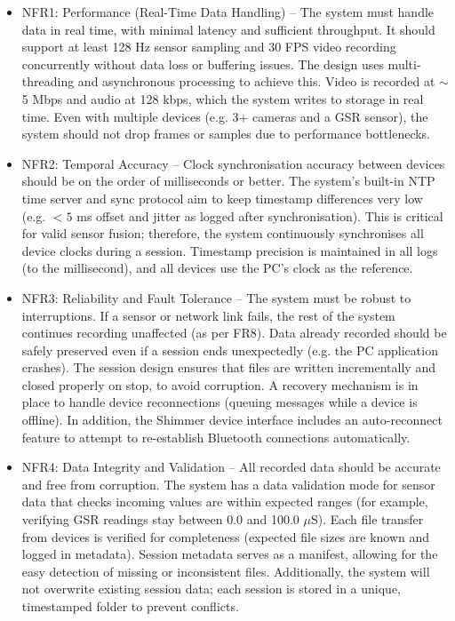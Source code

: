 \begin{itemize}
    \item NFR1: Performance (Real-Time Data Handling) -- The system must handle data in real time, with minimal latency and sufficient throughput. It should support at least 128 Hz sensor sampling and 30 FPS video recording concurrently without data loss or buffering issues. The design uses multi-threading and asynchronous processing to achieve this. Video is recorded at $\sim$5 Mbps and audio at 128 kbps, which the system writes to storage in real time. Even with multiple devices (e.g. 3+ cameras and a GSR sensor), the system should not drop frames or samples due to performance bottlenecks.

    \item NFR2: Temporal Accuracy -- Clock synchronisation accuracy between devices should be on the order of milliseconds or better. The system's built-in NTP time server and sync protocol aim to keep timestamp differences very low (e.g. $<5$ ms offset and jitter as logged after synchronisation). This is critical for valid sensor fusion; therefore, the system continuously synchronises all device clocks during a session. Timestamp precision is maintained in all logs (to the millisecond), and all devices use the PC's clock as the reference.

    \item NFR3: Reliability and Fault Tolerance -- The system must be robust to interruptions. If a sensor or network link fails, the rest of the system continues recording unaffected (as per FR8). Data already recorded should be safely preserved even if a session ends unexpectedly (e.g. the PC application crashes). The session design ensures that files are written incrementally and closed properly on stop, to avoid corruption. A recovery mechanism is in place to handle device reconnections (queuing messages while a device is offline). In addition, the Shimmer device interface includes an auto-reconnect feature to attempt to re-establish Bluetooth connections automatically.

    \item NFR4: Data Integrity and Validation -- All recorded data should be accurate and free from corruption. The system has a data validation mode for sensor data that checks incoming values are within expected ranges (for example, verifying GSR readings stay between 0.0 and 100.0 $\mu$S). Each file transfer from devices is verified for completeness (expected file sizes are known and logged in metadata). Session metadata serves as a manifest, allowing for the easy detection of missing or inconsistent files. Additionally, the system will not overwrite existing session data; each session is stored in a unique, timestamped folder to prevent conflicts.


\end{itemize}
